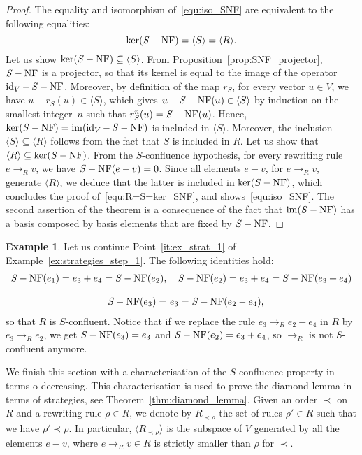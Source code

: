 \documentclass[11pt]{article}
\theoremstyle{definition}
\newtheorem{example}[theorem]{Example}
\newcommand\Rrho{R_{\prec\rho}}
\DeclareMathOperator{\id}{id}
\newcommand\Span[1]{\langle #1\rangle}
\DeclareMathOperator{\im}{im}
\newcommand\rewR{\to_R}
\DeclareMathOperator{\SNF}{{\it S}-NF}
\begin{document}
\begin{proof} 
  The equality and isomorphism of~\eqref{equ:iso_SNF} are equivalent to 
  the following equalities:
  \begin{equation}\label{equ:R=S=ker_SNF}
    \ker(\SNF)=\Span{S}=\Span{R}.
  \end{equation}
  Let us show $\ker(\SNF)\subseteq\Span{S}$. From
  Proposition~\ref{prop:SNF_projector}, $\SNF$ is a projector, so
  that its kernel is equal to the image of the operator $\id_V-\SNF$.
  Moreover, by definition of the map $r_S$, for every vector $u\in V$, we
  have $u-r_S(u)\in\Span{S}$, which gives $u-\SNF(u)\in\Span{S}$ by
  induction on the smallest integer~$n$ such that $r_S^n(u)=\SNF(u)$.
  Hence, $\ker(\SNF)=\im(\id_V-\SNF)$ is included in $\Span{S}$.
  Moreover, the inclusion $\Span{S}\subseteq\Span{R}$ follows from the
  fact that $S$ is included in $R$. Let us show that
  $\Span{R}\subseteq\ker(\SNF)$. From the $S$-confluence hypothesis, for
  every rewriting rule $e\rewR v$, we have $\SNF(e-v)=0$. Since all
  elements $e-v$, for $e\rewR v$, generate $\Span{R}$, we  deduce that
  the latter is included in $\ker(\SNF)$, which concludes the proof 
  of~\eqref{equ:R=S=ker_SNF}, and shows~\eqref{equ:iso_SNF}. The second
  assertion of the theorem is a consequence of the fact that $\im(\SNF)$
  has a basis composed by basis elements that are fixed by $\SNF$.
\end{proof}
\smallskip

\begin{example}\label{ex:S-conf}
  Let us continue Point~\ref{it:ex_strat_1} of
  Example~\ref{ex:strategies_step_1}. The following identities hold:
  \[\begin{split}
  \SNF(e_1)=e_3+e_4=\SNF(e_2),&\quad\SNF(e_2)=e_3+e_4=\SNF(e_3+e_4)
  \\[0.3cm]
  \SNF(e_3)=& \ e_3=\SNF(e_2-e_4),
  \end{split}
  \smallskip\]
  so that $R$ is $S$-confluent. Notice that if we replace the rule
  $e_3\rewR e_2-e_4$ in $R$ by $e_3\rewR e_2$, we get $\SNF(e_3)=e_3$ and
  $\SNF(e_2)=e_3+e_4$, so $\rewR$ is not $S$-confluent anymore. 
\end{example}
\smallskip

We finish this section with a characterisation of the $S$-confluence
property in terms o decreasing. This characterisation is used to prove
the diamond lemma in terms of strategies, see
Theorem~\ref{thm:diamond_lemma}. Given an order $\prec$ on $R$ and a
rewriting rule $\rho\in R$, we denote by $\Rrho$ the set of rules
$\rho'\in R$ such that we have $\rho'\prec\rho$. In particular,
$\Span{\Rrho}$ is the subspace of $V$ generated by all the elements
$e-v$, where $e\rewR v\in R$ is strictly smaller than $\rho$ for $\prec$.
\smallskip
\end{document}
